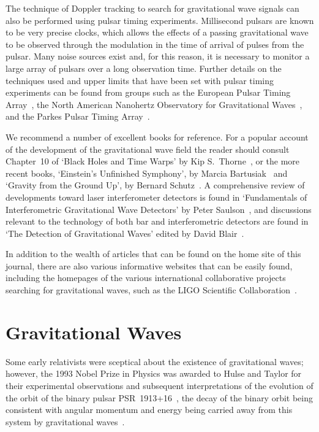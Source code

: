 \documentclass{article}
\begin{document}
The technique of Doppler tracking to search for gravitational wave signals can
also be performed using pulsar timing experiments.  Millisecond pulsars
\cite{Lorimer:2008} are known to be very precise clocks, which allows the
effects of a passing gravitational wave to be observed through the modulation in
the time of arrival of pulses from the pulsar.  Many noise sources exist and,
for this reason, it is necessary to monitor a large array of pulsars over a long
observation time.  Further details on the techniques used and upper limits that
have been set with pulsar timing experiments can be found from groups such as
the European Pulsar Timing Array~\cite{Janssen:2008}, the North American
Nanohertz Observatory for Gravitational Waves~\cite{Jenet:2006,Jenet:2009}, and
the Parkes Pulsar Timing Array~\cite{Hobbs:2008}.

We recommend a number of excellent books for reference. For a popular account of
the development of the gravitational wave field the reader should consult
Chapter~10 of `Black Holes and Time Warps' by Kip S.\ Thorne~\cite{Thorne}, or
the more recent books, `Einstein's Unfinished Symphony', by Marcia
Bartusiak~\cite{Bartusiak:2003} and `Gravity from the Ground Up', by Bernard
Schutz~\cite{Schutz:2003}. A comprehensive review of developments toward laser
interferometer detectors is found in `Fundamentals of Interferometric
Gravitational Wave Detectors' by Peter Saulson~\cite{Saulsonbook}, and
discussions relevant to the technology of both bar and interferometric detectors
are found in `The Detection of Gravitational Waves' edited by David
Blair~\cite{Blair}.

In addition to the wealth of articles that can be found on the home site of
this journal, there are also various informative websites that can be easily
found, including the homepages of the various international collaborative
projects searching for gravitational waves, such as the LIGO Scientific
Collaboration~\cite{LSCweb}.

\newpage


\section{Gravitational Waves}
\label{section:gravwaves}

Some early relativists were sceptical about the existence of gravitational
waves; however, the 1993 Nobel Prize in Physics was awarded to Hulse and Taylor
for their experimental observations and subsequent interpretations of the
evolution of the orbit of the binary pulsar PSR~1913+16~\cite{Hulse, Taylor},
the decay of the binary orbit being consistent with angular momentum and energy
being carried away from this system by gravitational waves~\cite{Will}.
\end{document}
